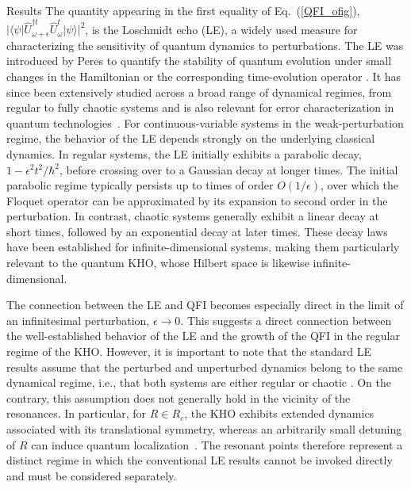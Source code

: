 \documentclass[amsmath,nobibnotes,aps,amssymb,pra, prl,aps,showpacs,superscriptaddress,twocolumn, longbibliography, reprint]{revtex4-2}
\begin{document}
\begin{section}{Results}
The quantity appearing in the first equality of Eq.~(\ref{QFI_ofig}),
$|\langle\psi|\hat{U}^{\dagger t}_{\omega+\epsilon}\hat{U}^{t}_{\omega}|\psi\rangle|^2$, is the Loschmidt echo (LE), a widely used measure for characterizing the sensitivity of quantum dynamics to perturbations. The LE was introduced by Peres to quantify the stability of quantum evolution under small changes in the Hamiltonian or the corresponding time-evolution operator \cite{peres1984stability}. It has since been extensively studied across a broad range of dynamical regimes, from regular to fully chaotic systems \cite{prosen2002stability,Goussev:2012} and is also relevant for error characterization in quantum technologies~\cite{Sahu2026Loschmidt}. For continuous-variable systems in the weak-perturbation regime, the behavior of the LE depends strongly on the underlying classical dynamics. In regular systems, the LE initially exhibits a parabolic decay, $1-\epsilon^2t^2/\hbar^2$, before crossing over to a Gaussian decay at longer times. The initial parabolic regime typically persists up to times of order $O(1/\epsilon)$, over which the Floquet operator can be approximated by its expansion to second order in the perturbation. In contrast, chaotic systems generally exhibit a linear decay at short times, followed by an exponential decay at later times. These decay laws have been established for infinite-dimensional systems, making them particularly relevant to the quantum KHO, whose Hilbert space is likewise infinite-dimensional.

The connection between the LE and QFI becomes especially direct in the limit of an infinitesimal perturbation, $\epsilon\rightarrow0$. This suggests a direct connection between the well-established behavior of the LE and the growth of the QFI in the regular regime of the KHO. However, it is important to note that the standard LE results assume that the perturbed and unperturbed dynamics belong to the same dynamical regime, i.e., that both systems are either regular or chaotic \cite{prosen2002stability}. On the contrary, this assumption does not generally hold in the vicinity of the resonances. In particular, for $R\in R_c$, the KHO exhibits extended dynamics associated with its translational symmetry, whereas an arbitrarily small detuning of $R$ can induce quantum localization~\cite{kells2005quantum}. The resonant points therefore represent a distinct regime in which the conventional LE results cannot be invoked directly and must be considered separately.




\end{section}
\end{document}
